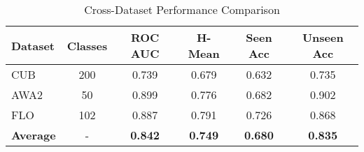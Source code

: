
\begin{table}[htbp]
\centering
\caption{Cross-Dataset Performance Comparison}
\label{tab:cross_dataset}
\begin{tabular}{|l|c|c|c|c|c|}
\hline
\textbf{Dataset} & \textbf{Classes} & \textbf{ROC AUC} & \textbf{H-Mean} & \textbf{Seen Acc} & \textbf{Unseen Acc} \\
\hline
CUB & 200 & 0.739 & 0.679 & 0.632 & 0.735 \\
AWA2 & 50 & 0.899 & 0.776 & 0.682 & 0.902 \\
FLO & 102 & 0.887 & 0.791 & 0.726 & 0.868 \\
\hline
\textbf{Average} & - & \textbf{0.842} & \textbf{0.749} & \textbf{0.680} & \textbf{0.835} \\
\hline
\end{tabular}
\end{table}
